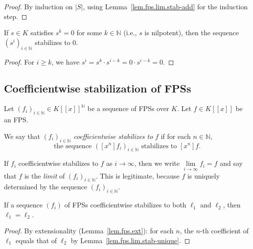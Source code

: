 \begin{proof}
\leanok
By induction on $|S|$, using Lemma~\ref{lem.fps.lim.stab-add} for the induction step.
\end{proof}

\begin{lemma}
\label{lem.fps.lim.stab-pow-nilpotent}
\leanhelper
\leanok
If $s \in K$ satisfies $s^k = 0$ for some $k \in \mathbb{N}$ (i.e., $s$ is nilpotent),
then the sequence $(s^i)_{i \in \mathbb{N}}$ stabilizes to $0$.
\end{lemma}

\begin{proof}
\leanok
For $i \geq k$, we have $s^i = s^k \cdot s^{i-k} = 0 \cdot s^{i-k} = 0$.
\end{proof}

\subsection{Coefficientwise stabilization of FPSs}

\begin{definition}
\label{def.fps.lim.coeff-stab}
\leantarget
\leanok
Let $\left(  f_{i}\right)  _{i\in\mathbb{N}}\in
K\left[  \left[  x\right]  \right]  ^{\mathbb{N}}$ be a sequence of FPSs over
$K$. Let $f\in K\left[  \left[  x\right]  \right]  $ be an FPS.

We say that $\left(  f_{i}\right)  _{i\in\mathbb{N}}$ \emph{coefficientwise
stabilizes to }$f$ if for each $n\in\mathbb{N}$,%
\[
\text{the sequence }\left(  \left[  x^{n}\right]  f_{i}\right)  _{i\in
\mathbb{N}}\text{ stabilizes to }\left[  x^{n}\right]  f.
\]

If $f_{i}$ coefficientwise stabilizes to $f$ as $i\rightarrow\infty$, then we
write $\lim\limits_{i\rightarrow\infty}f_{i}=f$ and say that $f$ is the
\emph{limit} of $\left(  f_{i}\right)  _{i\in\mathbb{N}}$.
This is legitimate, because $f$ is
uniquely determined by the sequence $\left(  f_{i}\right)  _{i\in\mathbb{N}}$.
\end{definition}

\begin{lemma}
\label{lem.fps.lim.coeff-stab-unique}
\leanhelper
\leanok
If a sequence $(f_i)$ of FPSs coefficientwise stabilizes to both $\ell_1$ and
$\ell_2$, then $\ell_1 = \ell_2$.
\end{lemma}

\begin{proof}
\leanok
By extensionality (Lemma~\ref{lem.fps.ext}): for each $n$, the $n$-th coefficient of $\ell_1$ equals
that of $\ell_2$ by Lemma~\ref{lem.fps.lim.stab-unique}.
\end{proof}

